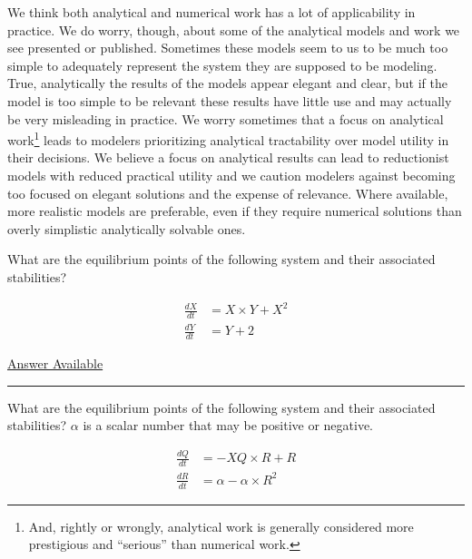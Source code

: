 \documentclass[]{memoir}
\begin{document}
We think both analytical and numerical work has a lot of applicability
in practice. We do worry, though, about some of the analytical models
and work we see presented or published. Sometimes these models seem to
us to be much too simple to adequately represent the system they are
supposed to be modeling. True, analytically the results of the models
appear elegant and clear, but if the model is too simple to be relevant
these results have little use and may actually be very misleading in
practice. We worry sometimes that a focus on analytical work\footnote{And,
  rightly or wrongly, analytical work is generally considered more
  prestigious and ``serious'' than numerical work.} leads to modelers
prioritizing analytical tractability over model utility in their
decisions. We believe a focus on analytical results can lead to
reductionist models with reduced practical utility and we caution
modelers against becoming too focused on elegant solutions and the
expense of relevance. Where available, more realistic models are
preferable, even if they require numerical solutions than overly
simplistic analytically solvable ones.


What are the equilibrium points of the following system and their
associated stabilities?

\[
\begin{aligned}
\frac{dX}{dt} &= X \times Y + X^2  \\
\frac{dY}{dt} &= Y + 2
\end{aligned}
\]

\hyperref[Ans-11-19]{Answer Available}

\begin{center}\rule{3in}{0.4pt}\end{center}


What are the equilibrium points of the following system and their
associated stabilities? $\alpha$ is a scalar number that may be positive
or negative.

\[
\begin{aligned}
\frac{dQ}{dt} &= -XQ\times R + R \\
\frac{dR}{dt} &= \alpha - \alpha \times R^2
\end{aligned}
\]
\end{document}
